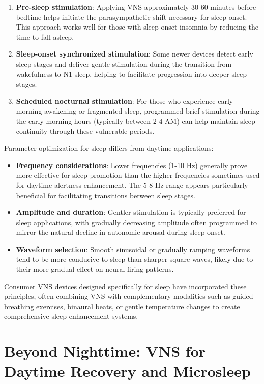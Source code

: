 \documentclass[
  Letterpaper,
]{scrbook}
\begin{document}
\begin{enumerate}
\def\labelenumi{\arabic{enumi}.}
\item
  \textbf{Pre-sleep stimulation}: Applying VNS approximately 30-60
  minutes before bedtime helps initiate the parasympathetic shift
  necessary for sleep onset. This approach works well for those with
  sleep-onset insomnia by reducing the time to fall asleep.
\item
  \textbf{Sleep-onset synchronized stimulation}: Some newer devices
  detect early sleep stages and deliver gentle stimulation during the
  transition from wakefulness to N1 sleep, helping to facilitate
  progression into deeper sleep stages.
\item
  \textbf{Scheduled nocturnal stimulation}: For those who experience
  early morning awakening or fragmented sleep, programmed brief
  stimulation during the early morning hours (typically between 2-4 AM)
  can help maintain sleep continuity through these vulnerable periods.
\end{enumerate}

Parameter optimization for sleep differs from daytime applications:

\begin{itemize}
\item
  \textbf{Frequency considerations}: Lower frequencies (1-10 Hz)
  generally prove more effective for sleep promotion than the higher
  frequencies sometimes used for daytime alertness enhancement. The 5-8
  Hz range appears particularly beneficial for facilitating transitions
  between sleep stages.
\item
  \textbf{Amplitude and duration}: Gentler stimulation is typically
  preferred for sleep applications, with gradually decreasing amplitude
  often programmed to mirror the natural decline in autonomic arousal
  during sleep onset.
\item
  \textbf{Waveform selection}: Smooth sinusoidal or gradually ramping
  waveforms tend to be more conducive to sleep than sharper square
  waves, likely due to their more gradual effect on neural firing
  patterns.
\end{itemize}

Consumer VNS devices designed specifically for sleep have incorporated
these principles, often combining VNS with complementary modalities such
as guided breathing exercises, binaural beats, or gentle temperature
changes to create comprehensive sleep-enhancement systems.

\section{Beyond Nighttime: VNS for Daytime Recovery and
Microsleep}\label{beyond-nighttime-vns-for-daytime-recovery-and-microsleep}
\end{document}
